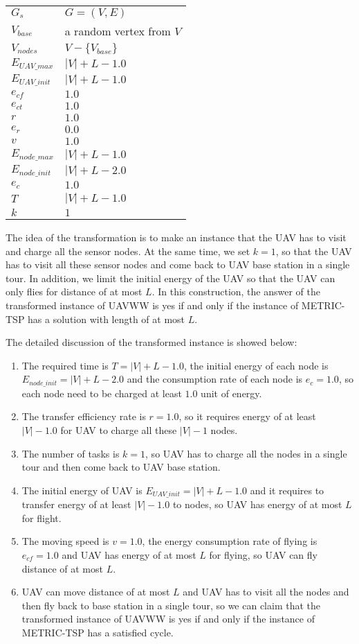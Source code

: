 \documentclass[11pt]{article}
\begin{document}
\begin{tabular}{| l | l |}
\hline
$G_s$ & $G = (V, E)$ \\
$V_{base}$ & a random vertex from $V$ \\
$V_{nodes}$ & $V - \{V_{base}\}$ \\
$E_{UAV\_max}$ & $|V| + L - 1.0$ \\
$E_{UAV\_init}$ & $|V| + L - 1.0$ \\
$e_{cf}$ & $1.0$ \\
$e_{ct}$ & $1.0$ \\
$r$ & $1.0$ \\
$e_r$ & $0.0$ \\
$v$ & $1.0$ \\
$E_{node\_max}$ & $|V| + L - 1.0$ \\
$E_{node\_init}$ & $|V| + L - 2.0$ \\
$e_{c}$ & $1.0$ \\
$T$ & $|V| + L - 1.0$ \\
$k $ & $1$ \\
\hline
\end{tabular}

The idea of the transformation is to make an instance that the UAV has to visit and charge all the sensor nodes. At the same time, we set $k = 1$, so that the UAV has to visit all these sensor nodes and come back to UAV base station in a single tour. In addition, we limit the initial energy of the UAV so that the UAV can only flies for distance of at most $L$. In this construction, the answer of the transformed instance of UAVWW is yes if and only if the instance of METRIC-TSP has a solution with length of at most $L$.

The detailed discussion of the transformed instance is showed below:
\begin{enumerate}[noitemsep]
\item The required time is $T = |V| + L - 1.0$, the initial energy of each node is $E_{node\_init} = |V| + L - 2.0$ and the consumption rate of each node is $e_{c} = 1.0$, so each node need to be charged at least $1.0$ unit of energy. \item The transfer efficiency rate is $r = 1.0$, so it requires energy of at least $|V| - 1.0$ for UAV to charge all these $|V| - 1$ nodes.
\item The number of tasks is $k = 1$, so UAV has to charge all the nodes in a single tour and then come back to UAV base station.
\item The initial energy of UAV is $E_{UAV\_init} = |V| + L - 1.0$ and it requires to transfer energy of at least $|V| - 1.0$ to nodes, so UAV has  energy of at most $L$ for flight. 
\item The moving speed is $v = 1.0$, the energy consumption rate of flying is  $e_{cf} = 1.0$ and UAV has energy of at most $L$ for flying, so UAV can fly distance of at most $L$.
\item UAV can move distance of at most $L$ and UAV has to visit all the nodes and then fly back to base station in a single tour, so we can claim that the transformed instance of UAVWW is yes if and only if the instance of METRIC-TSP has a satisfied cycle.
\end{enumerate}
\end{document}
